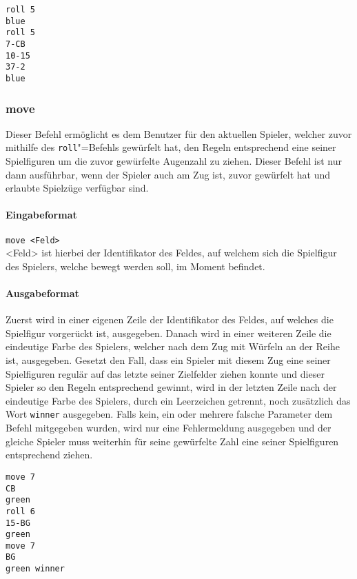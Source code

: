 \documentclass[
  name=\assignment,
  start=\releasedate,
  end=\duedate,
  subject=\lecture\,--\,\semester,
  group=\group,
  url=\theurl,
  author=\authors,
  mail=\themail
]{assignment}
\newcommand{\code}[1]{\colorbox{codegray}{\texttt{#1}}}
\begin{document}
\begin{tcolorbox}[title=Beispiel]
\begin{verbatim}
roll 5
blue
roll 5
7-CB
10-15
37-2
blue
\end{verbatim}
\end{tcolorbox}

\subsubsection*{move}
Dieser Befehl ermöglicht es dem Benutzer für den aktuellen Spieler, welcher zuvor mithilfe des \texttt{roll}"=Befehls gewürfelt hat, den Regeln entsprechend eine seiner Spielfiguren um die zuvor gewürfelte Augenzahl zu ziehen. Dieser Befehl ist nur dann ausführbar, wenn der Spieler auch am Zug ist, zuvor gewürfelt hat und erlaubte Spielzüge verfügbar sind.
\paragraph{Eingabeformat}
\code{move <Feld>}\\
<Feld> ist hierbei der Identifikator des Feldes, auf welchem sich die Spielfigur des Spielers, welche bewegt werden soll, im Moment befindet.
\paragraph{Ausgabeformat}
Zuerst wird in einer eigenen Zeile der Identifikator des Feldes, auf welches die Spielfigur vorgerückt ist, ausgegeben. Danach wird in einer weiteren Zeile die eindeutige Farbe des Spielers, welcher nach dem Zug mit Würfeln an der Reihe ist, ausgegeben.
Gesetzt den Fall, dass ein Spieler mit diesem Zug eine seiner Spielfiguren regulär auf das letzte seiner Zielfelder ziehen konnte und dieser Spieler so den Regeln entsprechend gewinnt, wird in der letzten Zeile nach der eindeutige Farbe des Spielers, durch ein Leerzeichen getrennt, noch zusätzlich das Wort \texttt{winner} ausgegeben.
Falls kein, ein oder mehrere falsche Parameter dem Befehl mitgegeben wurden, wird nur eine Fehlermeldung ausgegeben und der gleiche Spieler muss weiterhin für seine gewürfelte Zahl eine seiner Spielfiguren entsprechend ziehen.

\begin{tcolorbox}[title=Beispiel]
\begin{verbatim}
move 7
CB
green
roll 6
15-BG
green
move 7
BG
green winner
\end{verbatim}
\end{tcolorbox}
\end{document}
